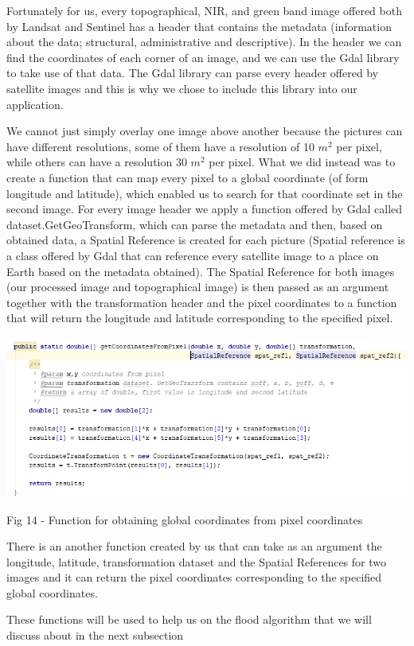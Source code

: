 \documentclass[12pt, a4paper]{report}
\begin{document}
Fortunately for us, every topographical, NIR, and green band image offered both by Landsat and Sentinel has a header that contains the metadata (information about the data; structural, administrative and descriptive). In the header we can find the coordinates of each corner of an image, and we can use the Gdal library to take use of that data. The Gdal library can parse every header offered by satellite images and this is why we chose to include this library into our application. 
\par 

We cannot just simply overlay one image above another because the pictures can have different resolutions, some of them have a resolution of 10 $m^2$ per pixel, while others can have a resolution 30 $m^2$ per pixel. What we did instead was to create a function that can map every pixel to a global coordinate (of form longitude and latitude), which enabled us to search for that coordinate set in the second image. For every image header we apply a function offered by Gdal called dataset.GetGeoTransform, which can parse the metadata and then, based on obtained data, a Spatial Reference is created for each picture (Spatial reference is a class offered by Gdal that can reference every satellite image to a place on Earth based on the metadata obtained). The Spatial Reference for both images (our processed image and topographical image) is then passed as an argument together with the transformation header and the pixel coordinates to a function that will return the longitude and latitude corresponding to the specified pixel.

\bigskip
\includegraphics[scale=0.8, left]{java_coordinate_mapping.png}
\begin{center}
Fig 14 - Function for obtaining global coordinates from pixel coordinates
\end{center}
\par 

\quad
There is an another function created by us that can take as an argument the longitude, latitude, transformation dataset and the Spatial References for two images and it can return the pixel coordinates corresponding to the specified global coordinates.
\par 
These functions will be used to help us on the flood algorithm that we will discuss about in the next subsection
\end{document}
